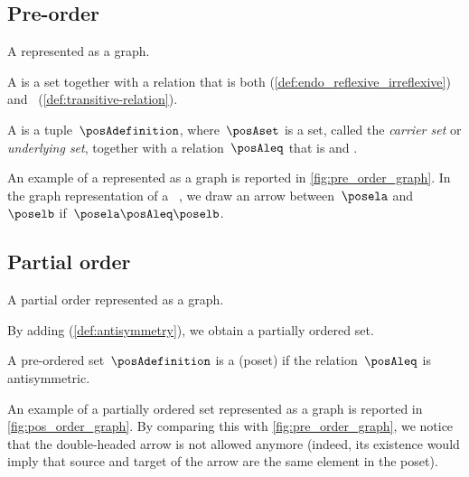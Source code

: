 
\vspace{2cm}

\subsection{Pre-order}
\begin{marginfigure}
    \centering
    \caption{A  represented as a graph.}
    \label{fig:pre_order_graph}
\end{marginfigure}

A  is a set together with a relation that is both  (\cref{def:endo_reflexive_irreflexive}) and ~(\cref{def:transitive-relation}).
\begin{ctdefinition}
    \label{def:preorder}
    A  is a tuple~$\posAdefinition$, where~$\posAset$ is a set, called the \emph{carrier set} or \emph{underlying set}, together with a relation~$\posAleq$ that is
     and .
\end{ctdefinition}
An example of a  represented as a graph is reported in \cref{fig:pre_order_graph}.
In the graph representation of a ~\posA, we draw an arrow between~$\posela$ and~$\poselb$ if~$\posela \posAleq \poselb$.

\vfill

\subsection{Partial order}

\begin{marginfigure}
    \centering
    \caption{A partial order represented as a graph.}
    \label{fig:pos_order_graph}
\end{marginfigure}
By adding \emph{} (\cref{def:antisymmetry}), we obtain a partially ordered set.

\begin{ctdefinition}
    \label{def:poset}
    A pre-ordered set~$\posAdefinition$ is a  (poset) if the relation~$\posAleq$ is antisymmetric.
\end{ctdefinition}

An example of a partially ordered set represented as a graph is reported in \cref{fig:pos_order_graph}.
By comparing this with \cref{fig:pre_order_graph}, we notice that the double-headed arrow is not allowed anymore (indeed, its existence would imply that source and target of the arrow are the same element in the poset).

